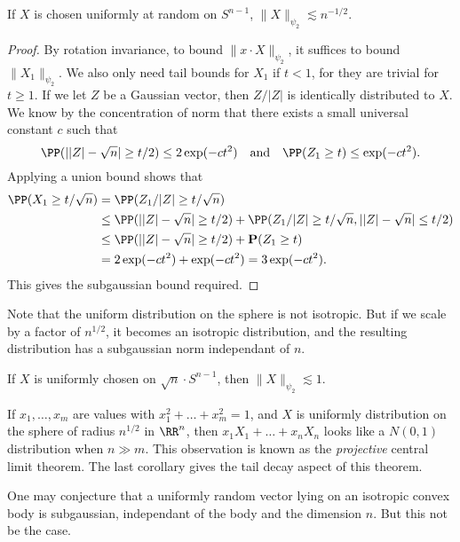 \begin{theorem}
    If $X$ is chosen uniformly at random on $S^{n-1}$, $\| X \|_{\psi_2} \lesssim n^{-1/2}$.
\end{theorem}
\begin{proof}
    By rotation invariance, to bound $\| x \cdot X \|_{\psi_2}$, it suffices to bound $\| X_1 \|_{\psi_2}$. We also only need tail bounds for $X_1$ if $t < 1$, for they are trivial for $t \geq 1$. If we let $Z$ be a Gaussian vector, then $Z/|Z|$ is identically distributed to $X$. We know by the concentration of norm that there exists a small universal constant $c$ such that
    \[ \PP(||Z| - \sqrt{n}| \geq t/2) \leq 2\exp(-ct^2)\quad\text{and}\quad \PP(Z_1 \geq t) \leq \exp(-ct^2). \]
    Applying a union bound shows that
    \begin{align*}
        \PP(X_1 \geq t/\sqrt{n}) &= \PP(Z_1/|Z| \geq t/\sqrt{n})\\
        &\leq \PP(||Z| - \sqrt{n}| \geq t/2) + \PP(Z_1/|Z| \geq t/\sqrt{n}, ||Z| - \sqrt{n}| \leq t/2)\\
        &\leq \PP(||Z| - \sqrt{n}| \geq t/2) + \mathbf{P}(Z_1 \geq t)\\
        &= 2 \exp(-ct^2) + \exp(-ct^2) = 3\exp(-ct^2).
    \end{align*}
    This gives the subgaussian bound required.
\end{proof}

Note that the uniform distribution on the sphere is not isotropic. But if we scale by a factor of $n^{1/2}$, it becomes an isotropic distribution, and the resulting distribution has a subgaussian norm independant of $n$.

\begin{corollary}
    If $X$ is uniformly chosen on $\sqrt{n} \cdot S^{n-1}$, then $\| X \|_{\psi_2} \lesssim 1$.
\end{corollary}

If $x_1, \dots, x_m$ are values with $x_1^2 + \dots + x_m^2 = 1$, and $X$ is uniformly distribution on the sphere of radius $n^{1/2}$ in $\RR^n$, then $x_1 X_1 + \dots + x_n X_n$ looks like a $N(0,1)$ distribution when $n \gg m$. This observation is known as the \emph{projective} central limit theorem. The last corollary gives the tail decay aspect of this theorem.

One may conjecture that a uniformly random vector lying on an isotropic convex body is subgaussian, independant of the body and the dimension $n$. But this not be the case.

